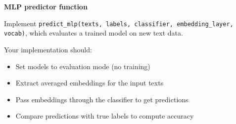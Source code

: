 \item {} \textbf{MLP predictor function}

Implement \texttt{predict\_mlp(texts, labels, classifier, embedding\_layer, vocab)}, which
evaluates a trained model on new text data.

Your implementation should:
\begin{itemize}
    \item Set models to evaluation mode (no training)
    \item Extract averaged embeddings for the input texts
    \item Pass embeddings through the classifier to get predictions
    \item Compare predictions with true labels to compute accuracy
\end{itemize}